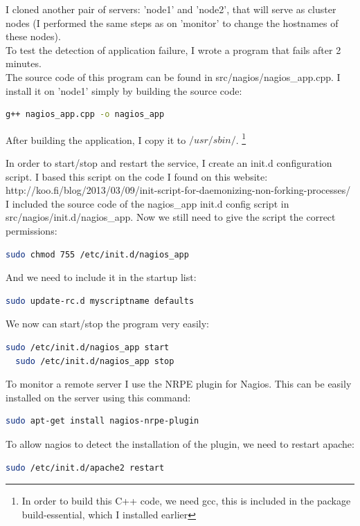 \documentclass[12pt]{report}
\begin{document}
I cloned another pair of servers: 'node1' and 'node2', that will serve as
cluster nodes (I performed the same steps as on 'monitor' to change
the hostnames of these nodes).\\

To test the detection of application failure, I wrote a program that
fails after 2 minutes. \\

The source code of this program can be found in src/nagios/nagios\_app.cpp.
I install it on 'node1' simply by building the source code:
\begin{lstlisting}[language=bash]
  g++ nagios_app.cpp -o nagios_app 
\end{lstlisting} 
After building the application, I copy it to $/usr/sbin/$.
\footnote{In order to build this C++ code, we need gcc, this is included
in the package build-essential, which I installed earlier}

In order to start/stop and restart the service, I create an init.d
configuration script.
I based this script on the code I found on this website: \\
http://koo.fi/blog/2013/03/09/init-script-for-daemonizing-non-forking-processes/ \\
I included the source code of the nagios\_app init.d config script in
\\ src/nagios/init.d/nagios\_app.
Now we still need to give the script the correct permissions:
\begin{lstlisting}[language=bash]
  sudo chmod 755 /etc/init.d/nagios_app
\end{lstlisting} 
And we need to include it in the startup list:
\begin{lstlisting}[language=bash]
  sudo update-rc.d myscriptname defaults
\end{lstlisting}

We now can start/stop the program very easily:
\begin{lstlisting}[language=bash]
  sudo /etc/init.d/nagios_app start
  sudo /etc/init.d/nagios_app stop
\end{lstlisting}

To monitor a remote server I use the NRPE plugin for Nagios. 
This can be easily installed on the server using this command:
\begin{lstlisting}[language=bash]
  sudo apt-get install nagios-nrpe-plugin
\end{lstlisting} 

To allow nagios to detect the installation of the plugin, we need to
restart apache:
\begin{lstlisting}[language=bash]
  sudo /etc/init.d/apache2 restart
\end{lstlisting} 
\end{document}
